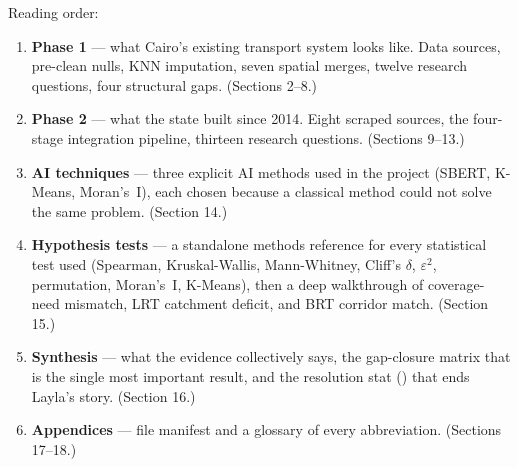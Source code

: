 Reading order:

\begin{enumerate}
  \item \textbf{Phase 1} — what Cairo's existing transport system looks like.
        Data sources, pre-clean nulls, KNN imputation, seven spatial
        merges, twelve research questions, four structural gaps.
        (Sections 2--8.)
  \item \textbf{Phase 2} — what the state built since 2014. Eight scraped
        sources, the four-stage integration pipeline, thirteen
        research questions. (Sections 9--13.)
  \item \textbf{AI techniques} — three explicit AI methods used in the
        project (SBERT, K-Means, Moran's~I), each chosen because a
        classical method could not solve the same problem. (Section 14.)
  \item \textbf{Hypothesis tests} — a standalone methods reference for
        every statistical test used (Spearman, Kruskal-Wallis,
        Mann-Whitney, Cliff's $\delta$, $\varepsilon^2$, permutation,
        Moran's~I, K-Means), then a deep walkthrough of 
        coverage-need mismatch,  LRT catchment deficit, and
         BRT corridor match. (Section 15.)
  \item \textbf{Synthesis} — what the evidence collectively says, the
        gap-closure matrix that is the single most important result,
        and the resolution stat () that ends
        Layla's story. (Section 16.)
  \item \textbf{Appendices} — file manifest and a glossary of every
        abbreviation. (Sections 17--18.)
\end{enumerate}
